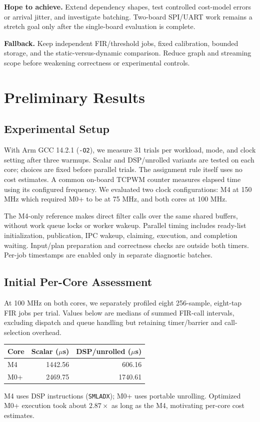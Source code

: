 \documentclass[10pt]{article}
\begin{document}
\textbf{Hope to achieve.} Extend dependency shapes, test controlled cost-model
errors or arrival jitter, and investigate batching. Two-board SPI/UART work
remains a stretch goal only after the single-board evaluation is complete.

\textbf{Fallback.} Keep independent FIR/threshold jobs, fixed calibration,
bounded storage, and the static-versus-dynamic comparison. Reduce graph and
streaming scope before weakening correctness or experimental controls.

\section{Preliminary Results}
\subsection{Experimental Setup}
With Arm GCC 14.2.1 (\texttt{-O2}), we measure 31 trials per workload,
mode, and clock setting after three warmups. Scalar and DSP/unrolled
variants are tested on each core; choices are fixed before parallel trials.
The assignment rule itself uses no cost estimates. A common on-board TCPWM
counter measures elapsed time using its configured frequency. We evaluated two clock configurations: M4 at 150 MHz which required M0+ to be at 75 MHz, and both cores at 100 MHz.

The M4-only reference makes direct filter calls over the same shared buffers,
without work queue locks or worker wakeup. Parallel timing includes ready-list
initialization, publication, IPC wakeup, claiming, execution, and completion
waiting. Input/plan preparation and correctness checks are outside both timers.
Per-job timestamps are enabled only in separate diagnostic batches.

\subsection{Initial Per-Core Assessment}
At 100 MHz on both cores, we separately profiled eight 256-sample,
eight-tap FIR jobs per trial. Values below are medians of summed FIR-call
intervals, excluding dispatch and queue handling but retaining timer/barrier
and call-selection overhead.
\begin{center}
\small
\begin{tabular}{@{}lrr@{}}
\toprule
\textbf{Core} & \textbf{Scalar ($\mu$s)} & \textbf{DSP/unrolled ($\mu$s)} \\
\midrule
M4 & 1442.56 & 606.16 \\
M0+ & 2469.75 & 1740.61 \\
\bottomrule
\end{tabular}
\end{center}
M4 uses DSP instructions (\texttt{SMLADX}); M0+ uses portable unrolling. Optimized M0+ execution took about $2.87\times$ as long as the M4, motivating per-core cost estimates.
\end{document}
